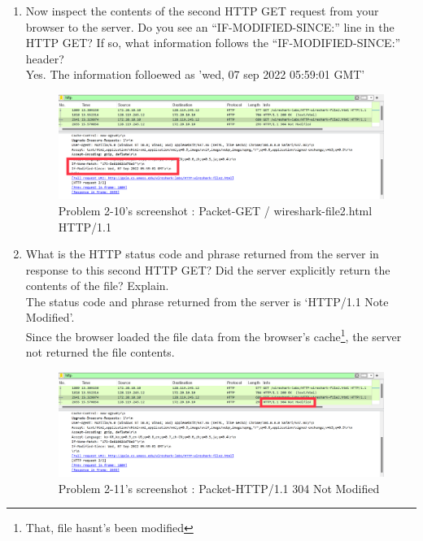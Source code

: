 \begin{enumerate}[label=\bfseries Problem \arabic*:,leftmargin=*,labelindent=1em]
\begin{figure}[!h]
        		\vspace{-10pt}
            \end{figure}           
        \item Now inspect the contents of the second HTTP GET request from your browser to the server. Do you see an “IF-MODIFIED-SINCE:” line in the HTTP GET? If so, what information follows the “IF-MODIFIED-SINCE:” header?\\[0.2mm]
            \soln Yes. The information folloewed as 'wed, 07 sep 2022 05:59:01 GMT'
            \begin{figure}[!h]\centering
            \hspace{10mm} 
        		\includegraphics[width=.78\textwidth]{image/result_week01/Q2-a.png}
        		\caption{\footnotesize Problem 2-10's screenshot : Packet-GET / wireshark-file2.html HTTP/1.1}
        		\vspace{-10pt}
            \end{figure}           
        \item What is the HTTP status code and phrase returned from the server in response to this second HTTP GET? Did the server explicitly return the contents of the file? Explain.\\[0.2mm]
            \soln The status code and phrase returned from the server is ‘HTTP/1.1 Note Modified’.\\
            Since the browser loaded the file data from the browser’s cache\footnote{That, file hasnt’s been modified},
            the server not returned the file contents.
\newpage
            \vspace{-2mm}  
            \begin{figure}[!h]\centering
            \hspace{10mm} 
        		\includegraphics[width=.79\textwidth]{image/result_week01/Q2-b.png}
        		\caption{\footnotesize Problem 2-11's screenshot : Packet-HTTP/1.1 304 Not Modified}
        		\vspace{-10pt}
            \end{figure}            
    \end{enumerate}
